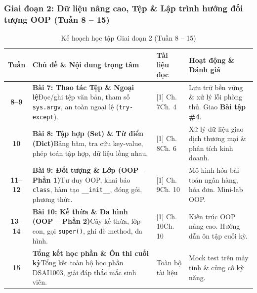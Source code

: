 \documentclass[11pt,a4paper]{article}
\begin{document}
\subsubsection*{Giai đoạn 2: Dữ liệu nâng cao, Tệp \& Lập trình hướng đối tượng OOP (Tuần 8 -- 15)}
\begin{table}[htbp]
\centering
\footnotesize
\begin{tabularx}{\textwidth}{@{}c p{5.5cm} p{2.8cm} X@{}}
\toprule
\textbf{Tuần} & \textbf{Chủ đề \& Nội dung trọng tâm} & \textbf{Tài liệu đọc} & \textbf{Hoạt động \& Đánh giá} \\
\midrule
\textbf{8--9} & \textbf{Bài 7: Thao tác Tệp \& Ngoại lệ}\newline Đọc/ghi tệp văn bản, tham số \texttt{sys.argv}, an toàn ngoại lệ (\texttt{try-except}). & [1] Ch. 7\newline [2] Ch. 4 & Lưu trữ bền vững \& xử lý lỗi phòng thủ. Giao \textbf{Bài tập \#4}. \\
\midrule
\textbf{10} & \textbf{Bài 8: Tập hợp (Set) \& Từ điển (Dict)}\newline Bảng băm, tra cứu key-value, phép toán tập hợp, dữ liệu lồng nhau. & [1] Ch. 8\newline [2] Ch. 6 & Xử lý dữ liệu giao dịch thương mại \& phân tích kinh doanh. \\
\midrule
\textbf{11--12} & \textbf{Bài 9: Đối tượng \& Lớp (OOP -- Phần 1)}\newline Tư duy OOP, khai báo \texttt{class}, hàm tạo \texttt{\_\_init\_\_}, đóng gói, phương thức. & [1] Ch. 9\newline [2] Ch. 10 & Mô hình hóa bài toán ngân hàng, hóa đơn. Mini-lab OOP. \\
\midrule
\textbf{13--14} & \textbf{Bài 10: Kế thừa \& Đa hình (OOP -- Phần 2)}\newline Cây kế thừa, lớp con, gọi \texttt{super()}, ghi đè method, đa hình. & [1] Ch. 10\newline [2] Ch. 10 & Kiến trúc OOP nâng cao. Hướng dẫn ôn tập cuối kỳ. \\
\midrule
\textbf{15} & \textbf{Tổng kết học phần \& Ôn thi cuối kỳ}\newline Tổng kết toàn bộ học phần DSAI1003, giải đáp thắc mắc sinh viên. & Toàn bộ tài liệu & Mock test trên máy tính \& củng cố kỹ năng. \\
\bottomrule
\end{tabularx}
\caption{Kế hoạch học tập Giai đoạn 2 (Tuần 8 -- 15)}
\end{table}
\end{document}
